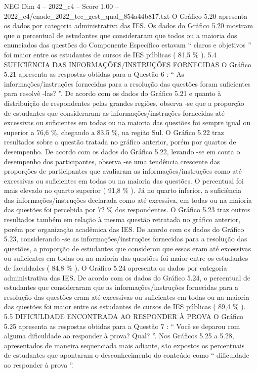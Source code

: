 \begin{textsample}{NEG Dim 4 – 2022\_c4 – Score 1.00 – 2022\_c4/enade\_2022\_tec\_gest\_qual\_854a44b817.txt}
O Gráfico 5.20 apresenta os dados por categoria administrativa das IES.
Os dados do Gráfico 5.20 mostram que o percentual de estudantes que consideraram que todos ou a maioria dos enunciados das questões do Componente Específico estavam “ claros e objetivos ” foi maior entre os estudantes de cursos de IES públicas ( 81,5 \% ). 5.4 SUFICIÊNCIA DAS INFORMAÇÕES/INSTRUÇÕES FORNECIDAS O Gráfico 5.21 apresenta as respostas obtidas para a Questão 6 : “ As informações/instruções fornecidas para a resolução das questões foram suficientes para resolvê -las? ”.
De acordo com os dados do Gráfico 5.21 e quanto à distribuição de respondentes pelas grandes regiões, observa -se que a proporção de estudantes que consideraram as informações/instruções fornecidas até excessivas ou suficientes em todas ou na maioria das questões foi sempre igual ou superior a 76,6 \%, chegando a 83,5 \%, na região Sul.
O Gráfico 5.22 traz resultados sobre a questão tratada no gráfico anterior, porém por quartos de desempenho.
De acordo com os dados do Gráfico 5.22, levando -se em conta o desempenho dos participantes, observa -se uma tendência crescente das proporções de participantes que avaliaram as informações/instruções como até excessivas ou suficientes em todas ou na maioria das questões.
O percentual foi mais elevado no quarto superior ( 91,8 \% ).
Já no quarto inferior, a suficiência das informações/instruções declarada como até excessiva, em todas ou na maioria das questões foi percebida por 72 \% dos respondentes.
O Gráfico 5.23 traz outros resultados também em relação à mesma questão retratada no gráfico anterior, porém por organização acadêmica das IES.
De acordo com os dados do Gráfico 5.23, considerando -se as informações/instruções fornecidas para a resolução das questões, a proporção de estudantes que considerou que essas eram até excessivas ou suficientes em todas ou na maioria das questões foi maior entre os estudantes de faculdades ( 84,8 \% ).
O Gráfico 5.24 apresenta os dados por categoria administrativa das IES.
De acordo com os dados do Gráfico 5.24, o percentual de estudantes que consideraram que as informações/instruções fornecidas para a resolução das questões eram até excessivas ou suficientes em todas ou na maioria das questões foi maior entre os estudantes de cursos de IES públicas ( 89,4 \% ). 5.5 DIFICULDADE ENCONTRADA AO RESPONDER À PROVA O Gráfico 5.25 apresenta as respostas obtidas para a Questão 7 : “ Você se deparou com alguma dificuldade ao responder à prova?
Qual? ”.
Nos Gráficos 5.25 a 5.28, apresentados de maneira sequenciada mais adiante, são expostos os percentuais de estudantes que apontaram o desconhecimento do conteúdo como “ dificuldade ao responder à prova ”.

\end{textsample}
